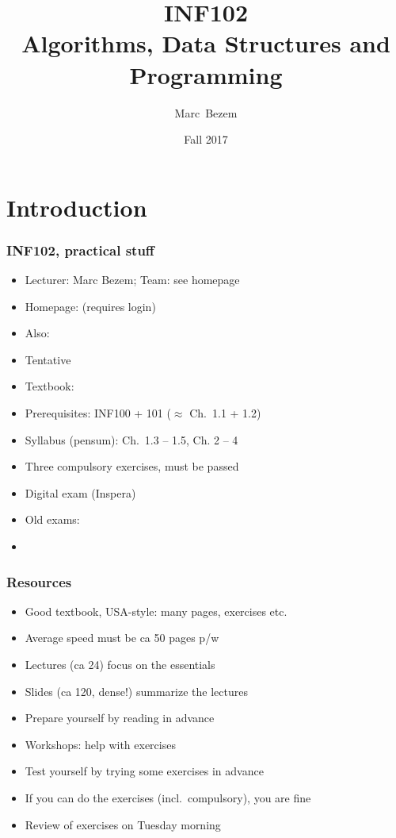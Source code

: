 \documentclass[handout]{beamer}
\title[INF102]%
{INF102\\Algorithms, Data Structures and Programming}
\author[Marc Bezem]{%
  Marc~Bezem\inst{1} %
  }
\institute[University of Bergen]{
  \inst{1}%
  Department of Informatics\\
  University of Bergen
  }
\date[INF102]{Fall 2017}
\newcommand{\git}{https://github.com/marcbezem/INF102/blob/master}
\begin{document}
  \frame
  {
    \titlepage
  }

\section{Introduction}

 \frame
  {
    
    \frametitle{INF102, practical stuff}\label{practicalstuff}

\begin{itemize}[<+->]
\item Lecturer: Marc Bezem; Team: see homepage
\item  Homepage:
\href{https://mitt.uib.no/courses/7191}%
{\color{red}{INF102}} (requires login)
\item Also: 
\href{https://github.com/marcbezem/INF102}%
{\color{red}{INF102 on GitHub}}
\item Tentative
\href{\git/lecturenotes/plan.pdf}%
{\color{red}{schedule}}
\item Textbook:
\href{http://algs4.cs.princeton.edu/home/}{\color{red}{Algorithms, 4th edition}}
\item Prerequisites: INF100 + 101 ($\approx$ Ch.\ 1.1 + 1.2)
\item  Syllabus (pensum): Ch.\ 1.3 -- 1.5, Ch. 2 -- 4
\item Three compulsory exercises, must be passed
\item Digital exam (Inspera)
\href{http://www.uib.no/student/108376/eksamensdatoer-det-matematisk-naturvitenskapelige-fakultet-høsten-2017-exam-dates}%
{\color{red}{06.12.2017}}
\item Old exams: 
\href{https://github.com/marcbezem/INF102/tree/master/oldexams}%
{\color{red}{2004--2017}}
\item \hyperlink{contentstable}{\color{red}{Table of Contents of these slides}}
\end{itemize}
}

 \frame
  {
    
    \frametitle{Resources}
\begin{itemize}[<+->]
\item Good textbook, USA-style: many pages, exercises etc.
\item Average speed must be ca 50 pages p/w
\item Lectures (ca 24) focus on the essentials
\item Slides (ca 120, dense!) summarize the lectures
\item Prepare yourself by reading in advance
\item Workshops: help with \href{\git/lecturenotes/plan.pdf}%
{\color{red}{selected}} exercises
\item Test yourself by trying some exercises in advance
\item If you can do the exercises (incl.\ compulsory), you are fine
\item Review of exercises on Tuesday morning
\end{itemize}
}
\end{document}
